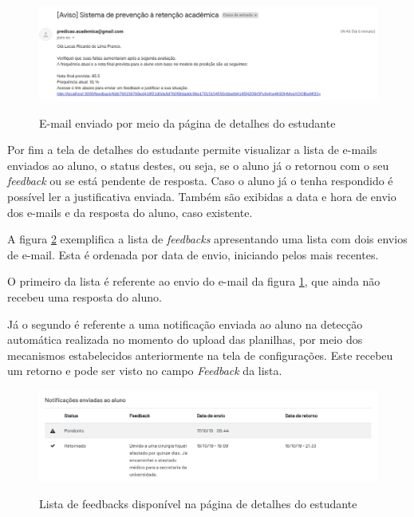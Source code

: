 \begin{figure}[!htb]
    \centering
    \caption{E-mail enviado por meio da página de detalhes do estudante}
    \includegraphics[width=1\textwidth]{./dados/figuras/sistema/sistema-detalhes-3}
    \label{fig:sistema-detalhes-3}
\end{figure}

Por fim a tela de detalhes do estudante permite visualizar a lista de e-mails enviados ao aluno, o status destes, ou seja, se o aluno já o retornou com o seu \textit{feedback} ou se está pendente de resposta. 
Caso o aluno já o tenha respondido é possível ler a justificativa enviada.
Também são exibidas a data e hora de envio dos e-mails e da resposta do aluno, caso existente.

A figura \ref{fig:sistema-detalhes-4} exemplifica a lista de \textit{feedbacks} apresentando uma lista com dois envios de e-mail. 
Esta é ordenada por data de envio, iniciando pelos mais recentes.

O primeiro da lista é referente ao envio do e-mail da figura \ref{fig:sistema-detalhes-3}, que ainda não recebeu uma resposta do aluno.

Já o segundo é referente a uma notificação enviada ao aluno na detecção automática realizada no momento do upload das planilhas, por meio dos mecanismos estabelecidos anteriormente na tela de configurações.
Este recebeu um retorno e pode ser visto no campo \textit{Feedback} da lista.

\begin{figure}[!htb]
    \centering
    \caption{Lista de feedbacks disponível na página de detalhes do estudante}
    \includegraphics[width=1\textwidth]{./dados/figuras/sistema/sistema-detalhes-4}
    \label{fig:sistema-detalhes-4}
\end{figure}